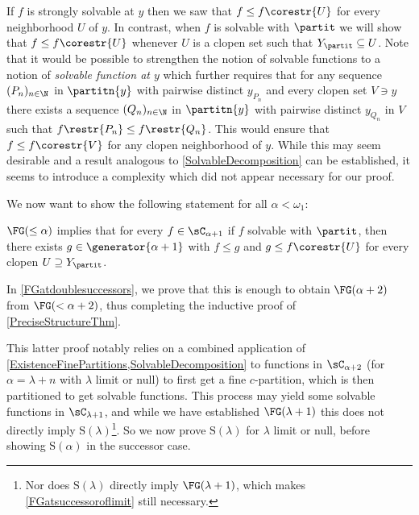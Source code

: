\begin{remark}
If $f$ is strongly solvable at $y$ then we saw that $f\leq f\corestr{U}$ for every neighborhood $U$ of $y$.
In contrast, when $f$ is solvable with $\partit$ we will show that $f\leq f\corestr{U}$ whenever $U$ is a clopen set such that $Y_\partit\subseteq U$.
Note that it would be possible to strengthen the notion of solvable functions to a notion of \emph{solvable function at $y$} which further requires that
for any sequence $(P_n)_{n\in \N}$ in $\partitn{y}$ with pairwise distinct $y_{P_n}$ and every clopen set $V\ni y$
there exists a sequence $(Q_n)_{n\in \N}$ in $\partitn{y}$ with pairwise distinct $y_{Q_n}$ in $V$ such that $f\restr{P_n}\leq f\restr{Q_n}$.
This would ensure that $f\leq f\corestr{V}$ for any clopen neighborhood of $y$.
While this may seem desirable and a result analogous to \cref{SolvableDecomposition} can be established,
it seems to introduce a complexity which did not appear necessary for our proof.
\end{remark}

We now want to show the following statement for all $\alpha<\omega_1$:
\begin{descThm}
 \item[$\text{S}(\alpha)$] $\FG(\leq \alpha)$ implies that for every $f\in \sC_{\alpha+1}$ if $f$ solvable with $\partit$, then there exists $g\in \generator{\alpha+1}$ with $f\leq g$ and $g\leq f\corestr{U}$ for every clopen $U\supseteq Y_\partit$.
  \end{descThm}
In \cref{FGatdoublesuccessors}, we prove that this is enough to obtain $\FG(\alpha+2)$ from $\FG(<\alpha+2)$, thus completing the inductive proof of \cref{PreciseStructureThm}.

This latter proof notably relies on a combined application of \cref{ExistenceFinePartitions,SolvableDecomposition}
to functions in $\sC_{\alpha+2}$ (for $\alpha=\lambda+n$ with $\lambda$ limit or null) to first get a fine $c$-partition, which is then partitioned to get solvable functions. %
This process may yield some solvable functions in $\sC_{\lambda+1}$, and
while we have established $\FG(\lambda+1)$ this does not directly imply $\text{S}(\lambda)$\footnote{Nor does $\text{S}(\lambda)$ directly imply $\FG(\lambda+1)$,
which makes \cref{FGatsuccessoroflimit} still necessary.}.
So we now prove $\text{S}(\lambda)$ for $\lambda$ limit or null, before showing $\text{S}(\alpha)$ in the successor case.

